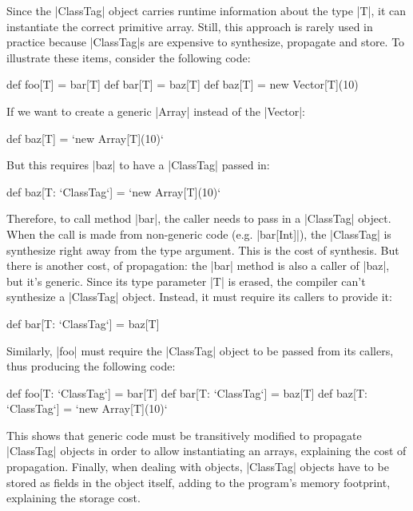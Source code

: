 Since the |ClassTag| object carries runtime information about the type |T|, it can instantiate the correct primitive array. Still, this approach is rarely used in practice because |ClassTag|s are expensive to synthesize, propagate and store.
To illustrate these items, consider the following code:

\begin{lstlisting-nobreak}
 def foo[T] = bar[T]
 def bar[T] = baz[T]
 def baz[T] = new Vector[T](10)
\end{lstlisting-nobreak}

If we want to create a generic |Array| instead of the |Vector|:

\begin{lstlisting-nobreak}
 def baz[T] = `new Array[T](10)`
\end{lstlisting-nobreak}

But this requires |baz| to have a |ClassTag| passed in:

\begin{lstlisting-nobreak}
 def baz[T: `ClassTag`] = `new Array[T](10)`
\end{lstlisting-nobreak}

Therefore, to call method |bar|, the caller needs to pass in a |ClassTag| object. When the call is made from non-generic code (e.g. |bar[Int]|), the |ClassTag| is synthesize right away from the type argument. This is the cost of synthesis. But there is another cost, of propagation: the |bar| method is also a caller of |baz|, but it's generic. Since its type parameter |T| is erased, the compiler can't synthesize a |ClassTag| object. Instead, it must require its callers to provide it:

\begin{lstlisting-nobreak}
 def bar[T: `ClassTag`] = baz[T]
\end{lstlisting-nobreak}

Similarly, |foo| must require the |ClassTag| object to be passed from its callers, thus producing the following code:

\begin{lstlisting-nobreak}
 def foo[T: `ClassTag`] = bar[T]
 def bar[T: `ClassTag`] = baz[T]
 def baz[T: `ClassTag`] = `new Array[T](10)`
\end{lstlisting-nobreak}

This shows that generic code must be transitively modified to propagate |ClassTag| objects in order to allow instantiating an arrays, explaining the cost of propagation. Finally, when dealing with objects, |ClassTag| objects have to be stored as fields in the object itself, adding to the program's memory footprint, explaining the storage cost.


